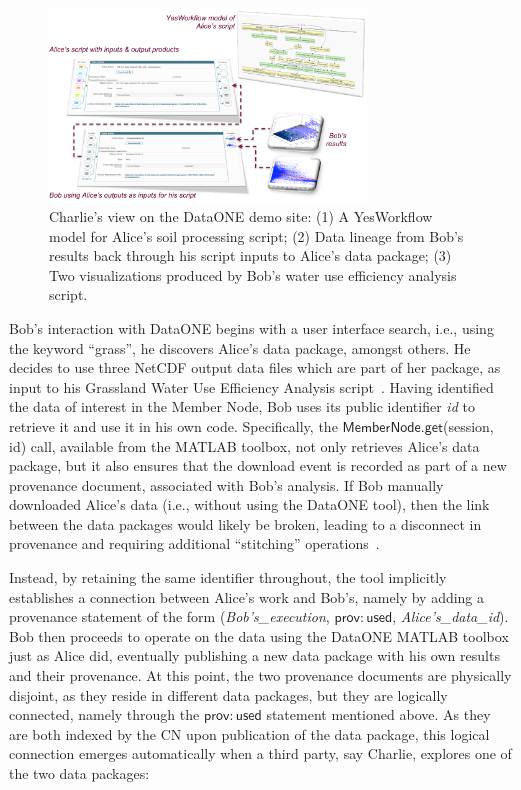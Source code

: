 \documentclass[a4paper]{llncs}
\newcommand{\code}[1]{\ensuremath{\mathsf{#1}}}
\begin{document}
\begin{figure}[h]
\centering   
\includegraphics[width=0.75\textwidth]{abc-crop}
\caption{Charlie's view on the DataONE demo site: (1) A YesWorkflow model for Alice's soil processing script; (2) Data lineage from Bob's results back through his script inputs to Alice's data package; (3) Two visualizations produced by Bob's water use efficiency analysis script.}
\label{fig2}
\end{figure}


Bob's interaction with DataONE begins with a user interface search, i.e., using the keyword ``grass'', he discovers Alice's data package, amongst others.  He decides to use three NetCDF output data files which are part of her package, as input to his Grassland Water Use Efficiency Analysis script~\cite{MsTMIP-model-output-data-set}.  Having identified the data of interest in the Member Node, Bob uses its public identifier \textit{id} to retrieve it and use it in his own code. %
Specifically, the \code{MemberNode.get}(session, id) call, available from the MATLAB toolbox, not only retrieves Alice's data package, but it also ensures that the download event is recorded as part of a new provenance document, associated with Bob's analysis.
%
If Bob manually downloaded Alice's data (i.e., without using the DataONE tool), then the link between the data packages would likely be broken, leading to a disconnect in provenance and requiring additional ``stitching'' operations~\cite{missing-link}.


Instead, by retaining the same identifier throughout, the tool implicitly establishes a connection between Alice's work and Bob's, namely by adding a provenance statement of the form (\emph{{Bob's\_execution}}, \code{prov{:}used}, {\emph{Alice's\_data\_id}}). Bob then proceeds to operate on the data using the DataONE MATLAB toolbox just as Alice did, eventually publishing a new data package with his own results and their provenance.  At this point, the two provenance documents are physically disjoint, as they reside in different data packages, but they are logically connected, namely through the \code{prov{:}used} statement mentioned above.  As they are both indexed by the CN upon publication of the data package, this logical connection emerges automatically when a third party, say Charlie, explores one of the two data packages:
\end{document}

